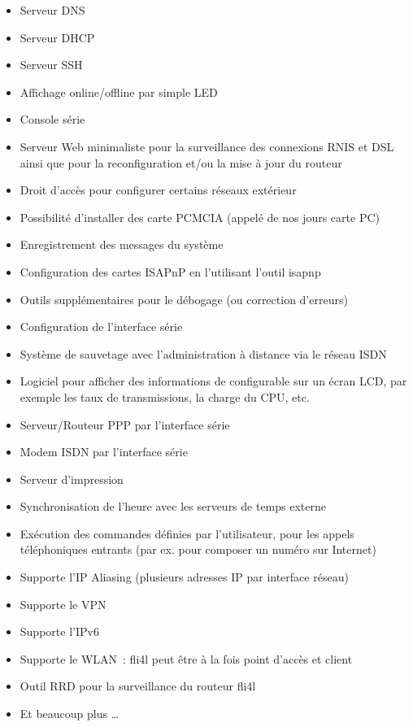 \begin{itemize}
\begin{itemize}
\item Serveur DNS
\item Serveur DHCP
\item Serveur SSH
\item Affichage online/offline par simple LED
\item Console série
\item Serveur Web minimaliste pour la surveillance des connexions RNIS et DSL
      ainsi que pour la reconfiguration et/ou la mise à jour du routeur
\item Droit d'accès pour configurer certains réseaux extérieur
\item Possibilité d'installer des carte PCMCIA (appelé de nos jours carte PC)
\item Enregistrement des messages du système
\item Configuration des cartes ISAPnP en l'utilisant l'outil isapnp
\item Outils supplémentaires pour le débogage (ou correction d'erreurs)
\item Configuration de l'interface série
\item Système de sauvetage avec l'administration à distance via le réseau ISDN
\item Logiciel pour afficher des informations de configurable sur un écran LCD,
      par exemple les taux de transmissions, la charge du CPU, etc.
\item Serveur/Routeur PPP par l'interface série
\item Modem ISDN par l'interface série
\item Serveur d'impression
\item Synchronisation de l'heure avec les serveurs de temps externe
\item Exécution des commandes définies par l'utilisateur, pour les appels
      téléphoniques entrants (par ex. pour composer un numéro sur Internet)
\item Supporte l'IP Aliasing (plusieurs adresses IP par interface réseau)
\item Supporte le VPN
\item Supporte l'IPv6
\item Supporte le WLAN~: fli4l peut être à la fois point d'accès et client
\item Outil RRD pour la surveillance du routeur fli4l
\item Et beaucoup plus \ldots
\end{itemize}


\end{itemize}
